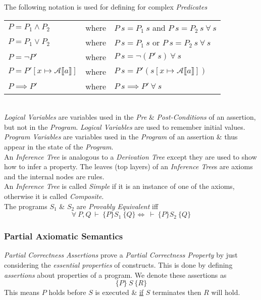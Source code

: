 \documentclass[11pt,a4paper]{article}
\begin{document}
The following notation is used for defining for complex \textit{Predicates}\\
\begin{tabular}{lcl}
$P=P_1\wedge P_2$&where&$P\ s=P_1\ s$ and $P\ s=P_2\ s\ \forall\ s$\\
$P=P_1\vee P_2$&where&$P\ s=P_1\ s$ or $P\ s=P_2\ s\ \forall\ s$\\
$P=\neg P'$&where&$P\ s=\neg(P'\ s)\ \forall\ s$\\
$P=P'[x\mapsto\mathcal{A}\llbracket a\rrbracket]$&where&$P\ s=P' (s[x\mapsto\mathcal{A}\llbracket a\rrbracket])$\\
$P\implies P'$&where&$P\ s\implies P'\ \forall\ s$
\end{tabular}\\

\textit{Logical Variables} are variables used in the \textit{Pre} \& \textit{Post-Conditions} of an assertion, but not in the \textit{Program}. \textit{Logical Variables} are used to remember initial values.\\

\textit{Program Variables} are variables used in the \textit{Program} of an assertion \& thus appear in the state of the \textit{Program}.\\

An \textit{Inference Tree} is analogous to a \textit{Derivation Tree} except they are used to show how to infer a property. The leaves (top layers) of an \textit{Inference Tree}s are axioms and the internal nodes are rules.\\
\NB An \textit{Inference Tree} is called \textit{Simple} if it is an instance of one of the axioms, otherwise it is called \textit{Composite}.\\

The programs $S_1$ \& $S_2$ are \textit{Provably Equivalent} iff
$$\forall\ P,Q\ \vdash\ \{P\} S_1\ \{Q\}\Leftrightarrow\ \vdash\ \{P\} S_2\ \{Q\}$$

\subsubsection{Partial Axiomatic Semantics}

\textit{Partial Correctness Assertions} prove a \textit{Partial Correctness Property} by just considering the \textit{essential properties} of constructs. This is done by defining \textit{assertions} about properties of a program. We denote these assertions as
$$\{P\}\ S\ \{R\}$$
This means $P$ holds before $S$ is executed \& \underline{if} $S$ terminates then $R$ will hold.\\
\end{document}

